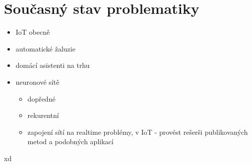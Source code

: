 \chapter{Současný stav problematiky} \label{chap:background}

\begin{itemize}
    \item IoT obecně
    \item automatické žaluzie
    \item domácí asistenti na trhu
    \item neuronové sítě
    \begin{itemize}
        \item dopředné
        \item rekurentní
        \item zapojení sítí na realtime problémy, v IoT - provést rešerši publikovaných metod a podobných aplikací  
    \end{itemize}  
\end{itemize}
\newpage
xd